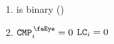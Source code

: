 \begin{enumerate}
    \item \lc{} is binary \quad (\sanityCheck)
    \item \If $\isCmp _{i} = 0$ \Then $\texttt{LC}_{i} = 0$
\end{enumerate}
